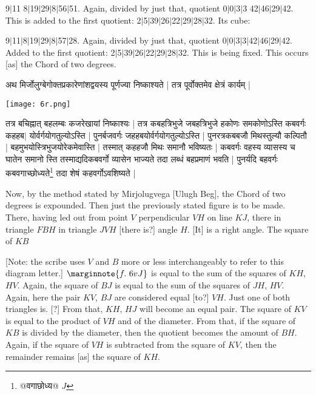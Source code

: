 \documentclass[12pt]{book}
\def\danda{$|$}
\begin{document}
9\danda 11 8\danda 19\danda 29\danda 8\danda 56\danda 51. Again, divided by just that,
quotient 0\danda 0\danda 3\danda 3 42\danda 46\danda 29\danda 42. This is added to the first 
quotient: 2\danda 5\danda 39\danda 26\danda 22\danda 29\danda 28\danda 32. Its cube: 

9\danda 11\danda 8\danda 19\danda 29\danda 8\danda 57\danda 28. Again, divided by just that,
quotient 0\danda 0\danda 3\danda 3\danda 42\danda 46\danda 29\danda 42. 
Added to the first quotient: 2\danda 5\danda 39\danda 26\danda 22\danda 29\danda 28\danda 32.
This is being fixed. This occurs [as] the Chord of two degrees.

\newpage

{\s अथ मिर्जोलुग्बेगोक्तप्रकारेणांशद्वयस्य पूर्णज्या निष्काश्यते | तत्र पूर्वोक्तमेव क्षेत्रं
कार्यम् |} \\ 

\begin{center}
\texttt{[image: 6r.png]}
\end{center}
 
{\s तत्र बचिह्नात् बहलम्बः कजरेखायां निष्काश्यः | तत्र कबहत्रिभुजे जबहत्रिभुजे हकोणः समकोणोऽस्ति कबवर्गः कहहब$|$
योर्वर्गयोगतुल्योऽस्ति | पुनर्बजवर्गः जहहबयोर्वर्गयोगतुल्योऽस्ति | 
पुनरत्रकबबजौ मिथस्तुल्यौ कल्पितौ | बहमुभ\-योस्त्रिभुजयोरेकमेवास्ति | तस्मात् कहहजौ मिथः समानौ भविष्यतः | कबवर्गः वहस्य व्यासस्य च घातेन समानो स्ति तस्माद्यदिकबवर्गो व्यासेन भाज्यते तदा लब्धं बहप्रमाणं भवति |
पुनर्यदि बहवर्गः कबवगाच्छोध्यते\footnote{{\s @वगाछोध्य@} $J$ } तदा शेषं कहवर्गोऽवशिष्यते |} 

\newpage

Now, by the method stated by Mirjolugvega [Ulugh Beg], the Chord of two degrees is expounded. 
Then just the previously stated figure is to be made. \\ 

\iffalse
\begin{center}
\texttt{[image: 6r.png]}
\captionof{figure}{6r}
\end{center}
\fi 

There, having led out from point $V$ perpendicular $VH$ on line $KJ$, there in triangle
$FBH$ in triangle $JVH$ [there is?] angle $H$. [It] is a right angle. The square of $KB$ 

[Note: the scribe uses $V$ and $B$ more or less interchangeably to refer to this 
diagram letter.]
$\marginnote{f.~6v J}$
is equal to the sum of the squares of $KH$, $HV$. Again, the square of $BJ$ is equal to the
sum of the squares of $JH$, $HV$. Again, here the pair $KV$, $BJ$ are considered equal 
[to?] $VH$. Just one of both triangles is.  [?] From that, $KH$, $HJ$ will become an equal pair.
The square of $KV$ is equal to the product of $VH$ and of the diameter. From that, if the 
square of $KB$ is divided by the diameter, then the quotient becomes the amount of $BH$.
Again, if the square of $VH$ is subtracted from the square of $KV$, then the remainder
remains [as] the square of $KH$.  
\end{document}

